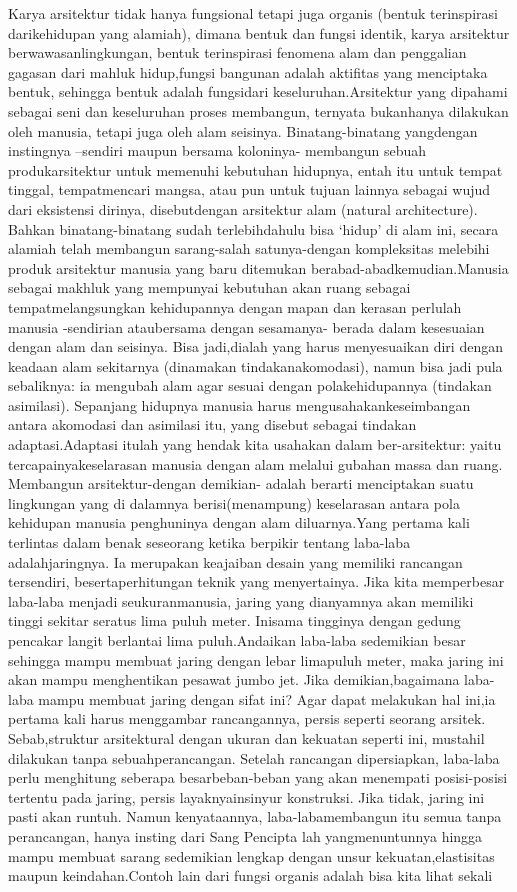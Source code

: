 \documentclass[../manperil.tex]{subfiles}
\begin{document}
Karya arsitektur tidak hanya fungsional tetapi juga organis (bentuk terinspirasi darikehidupan yang alamiah), dimana bentuk dan fungsi identik, karya arsitektur berwawasanlingkungan, bentuk terinspirasi fenomena alam dan penggalian gagasan dari mahluk hidup,fungsi bangunan adalah aktifitas yang menciptaka bentuk, sehingga bentuk adalah fungsidari keseluruhan.Arsitektur yang dipahami sebagai seni dan keseluruhan proses membangun, ternyata bukanhanya dilakukan oleh manusia, tetapi juga oleh alam seisinya. Binatang-binatang yangdengan instingnya –sendiri maupun bersama koloninya- membangun sebuah produkarsitektur untuk memenuhi kebutuhan hidupnya, entah itu untuk tempat tinggal, tempatmencari mangsa, atau pun untuk tujuan lainnya sebagai wujud dari eksistensi dirinya, disebutdengan arsitektur alam (natural architecture). Bahkan binatang-binatang sudah terlebihdahulu bisa ‘hidup’ di alam ini, secara alamiah telah membangun sarang-salah satunya-dengan kompleksitas melebihi produk arsitektur manusia yang baru ditemukan berabad-abadkemudian.Manusia sebagai makhluk yang mempunyai kebutuhan akan ruang sebagai tempatmelangsungkan kehidupannya dengan mapan dan kerasan perlulah manusia -sendirian ataubersama dengan sesamanya- berada dalam kesesuaian dengan alam dan seisinya. Bisa jadi,dialah yang harus menyesuaikan diri dengan keadaan alam sekitarnya (dinamakan tindakanakomodasi), namun bisa jadi pula sebaliknya: ia mengubah alam agar sesuai dengan polakehidupannya (tindakan asimilasi). Sepanjang hidupnya manusia harus mengusahakankeseimbangan antara akomodasi dan asimilasi itu, yang disebut sebagai tindakan adaptasi.Adaptasi itulah yang hendak kita usahakan dalam ber-arsitektur: yaitu tercapainyakeselarasan manusia dengan alam melalui gubahan massa dan ruang. Membangun arsitektur-dengan demikian- adalah berarti menciptakan suatu lingkungan yang di dalamnya berisi(menampung) keselarasan antara pola kehidupan manusia penghuninya dengan alam diluarnya.Yang pertama kali terlintas dalam benak seseorang ketika berpikir tentang laba-laba adalahjaringnya. Ia merupakan keajaiban desain yang memiliki rancangan tersendiri, besertaperhitungan teknik yang menyertainya. Jika kita memperbesar laba-laba menjadi seukuranmanusia, jaring yang dianyamnya akan memiliki tinggi sekitar seratus lima puluh meter. Inisama tingginya dengan gedung pencakar langit berlantai lima puluh.Andaikan laba-laba sedemikian besar sehingga mampu membuat jaring dengan lebar limapuluh meter, maka jaring ini akan mampu menghentikan pesawat jumbo jet. Jika demikian,bagaimana laba-laba mampu membuat jaring dengan sifat ini? Agar dapat melakukan hal ini,ia pertama kali harus menggambar rancangannya, persis seperti seorang arsitek. Sebab,struktur arsitektural dengan ukuran dan kekuatan seperti ini, mustahil dilakukan tanpa sebuahperancangan. Setelah rancangan dipersiapkan, laba-laba perlu menghitung seberapa besarbeban-beban yang akan menempati posisi-posisi tertentu pada jaring, persis layaknyainsinyur konstruksi. Jika tidak, jaring ini pasti akan runtuh. Namun kenyataannya, laba-labamembangun itu semua tanpa perancangan, hanya insting dari Sang Pencipta lah yangmenuntunnya hingga mampu membuat sarang sedemikian lengkap dengan unsur kekuatan,elastisitas maupun keindahan.Contoh lain dari fungsi organis adalah bisa kita lihat sekali 
\end{document}
